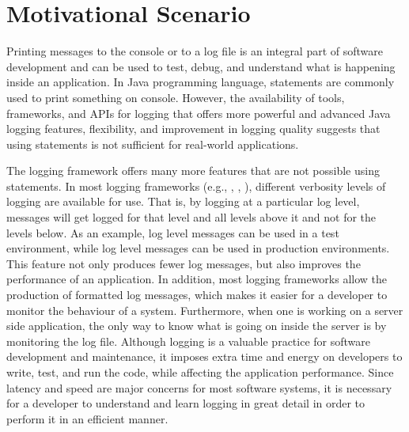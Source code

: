 \chapter{Motivational Scenario}  \label{ch2}

Printing messages to the console or to a log file is an integral part of software development and can be used to test, debug, and understand what is happening inside an application. In Java programming language,  statements
are commonly used to print something on console. However, the availability of tools, frameworks, and APIs for logging that offers more powerful and advanced Java logging features, flexibility, and improvement in logging quality suggests that using  statements is not sufficient for real-world applications.


The logging framework offers many more features that are not possible using  statements. In most logging frameworks (e.g., , , ), different verbosity levels of logging are available for use. That is, by logging at a particular log level, messages will get logged for that level and all levels above it and not for the levels below. As an example,  log level messages can be used in a test environment, while  log level messages can be used in production environments. This feature not only produces fewer log messages, but also improves the performance of an application. In addition, most logging frameworks allow the production of formatted log messages, which makes it easier for a developer to monitor the behaviour of a system. Furthermore, when one is working on a server side application, the only way to know what is going on inside the server is by monitoring the log file. Although logging is a valuable practice for software development and maintenance, it imposes extra time and energy on developers to write, test, and run the code, while affecting the application performance. Since latency and speed are major concerns for most software systems, it is necessary  for a developer to understand and learn logging in great detail in order to perform it in an efficient manner.

